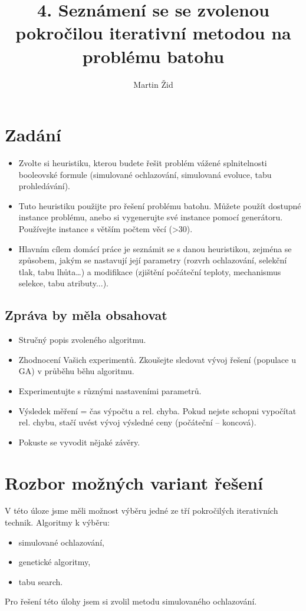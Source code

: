 \documentclass[10pt,a4paper]{article}
\author{Martin Žid}
\title{4. Seznámení se se zvolenou pokročilou iterativní metodou na problému batohu}
\date{}
\begin{document}
\maketitle

\section{Zadání}
\begin{itemize}
 \item Zvolte si heuristiku, kterou budete řešit problém vážené splnitelnosti booleovské formule (simulované ochlazování, simulovaná evoluce, tabu prohledávání).
 \item Tuto heuristiku použijte pro řešení problému batohu. Můžete použít dostupné instance problému, anebo si vygenerujte své instance pomocí generátoru. Používejte instance s větším počtem věcí (>30).
 \item Hlavním cílem domácí práce je seznámit se s danou heuristikou, zejména se způsobem, jakým se nastavují její parametry (rozvrh ochlazování, selekční tlak, tabu lhůta…) a modifikace (zjištění počáteční teploty, mechanismus selekce, tabu atributy...).
\end{itemize} 

 \subsection{Zpráva by měla obsahovat} 
  \begin{itemize}
   \item Stručný popis zvoleného algoritmu.
   \item Zhodnocení Vašich experimentů. Zkoušejte sledovat vývoj řešení (populace u GA) v průběhu běhu algoritmu.
   \item Experimentujte s různými nastaveními parametrů.
   \item Výsledek měření = čas výpočtu a rel. chyba. Pokud nejste schopni vypočítat rel. chybu, stačí uvést vývoj výsledné ceny (počáteční -- koncová).
   \item Pokuste se vyvodit nějaké závěry.
  \end{itemize}
  
\section{Rozbor možných variant řešení}
V této úloze jsme měli možnost výběru jedné ze tří pokročilých iterativních technik.
Algoritmy k výběru:
\begin{itemize}
 \item simulované ochlazování,
 \item genetické algoritmy,
 \item tabu search.
\end{itemize}
Pro řešení této úlohy jsem si zvolil metodu simulovaného ochlazování.
\end{document}
